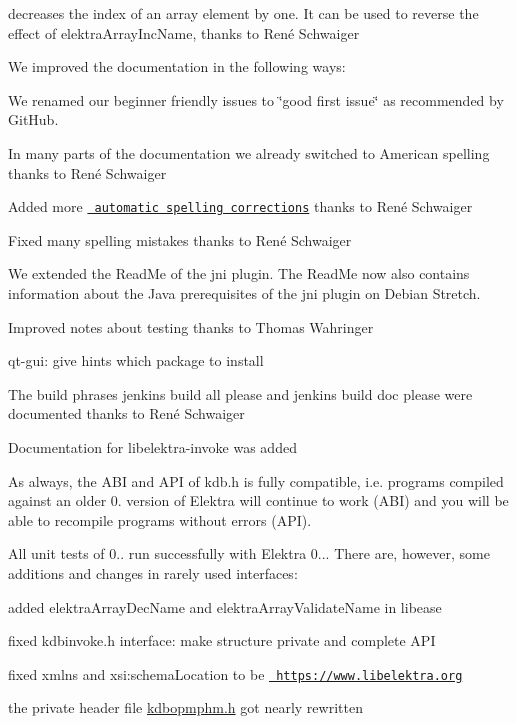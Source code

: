 \begin{DoxyCode}{0}
\end{DoxyCode}


decreases the index of an array element by one. It can be used to reverse the effect of {\ttfamily elektra\+Array\+Inc\+Name}, thanks to René Schwaiger

We improved the documentation in the following ways\+:


\begin{DoxyItemize}
\item We renamed our beginner friendly issues to \char`\"{}good first issue\char`\"{} as recommended by Git\+Hub.
\item In many parts of the documentation we already switched to American spelling thanks to René Schwaiger
\item Added more \href{https://master.libelektra.org/scripts/sed}{\texttt{ automatic spelling corrections}} thanks to René Schwaiger
\item Fixed many spelling mistakes thanks to René Schwaiger
\item We extended the Read\+Me of the {\ttfamily jni} plugin. The Read\+Me now also contains information about the Java prerequisites of the {\ttfamily jni} plugin on Debian Stretch.
\item Improved notes about testing thanks to Thomas Wahringer
\item qt-\/gui\+: give hints which package to install
\item The build phrases {\ttfamily jenkins build all please} and {\ttfamily jenkins build doc please} were documented thanks to René Schwaiger
\item Documentation for libelektra-\/invoke was added
\end{DoxyItemize}

As always, the A\+BI and A\+PI of kdb.\+h is fully compatible, i.\+e. programs compiled against an older 0. version of Elektra will continue to work (A\+BI) and you will be able to recompile programs without errors (A\+PI).

All unit tests of 0.. run successfully with Elektra 0... There are, however, some additions and changes in rarely used interfaces\+:


\begin{DoxyItemize}
\item added {\ttfamily elektra\+Array\+Dec\+Name} and {\ttfamily elektra\+Array\+Validate\+Name} in libease
\item fixed {\ttfamily kdbinvoke.\+h} interface\+: make structure private and complete A\+PI
\item fixed {\ttfamily xmlns} and {\ttfamily xsi\+:schema\+Location} to be {\ttfamily \href{https://www.libelektra.org}{\texttt{ https\+://www.\+libelektra.\+org}}}
\item the private header file {\ttfamily \mbox{\hyperlink{kdbopmphm_8h}{kdbopmphm.\+h}}} got nearly rewritten
\end{DoxyItemize}

